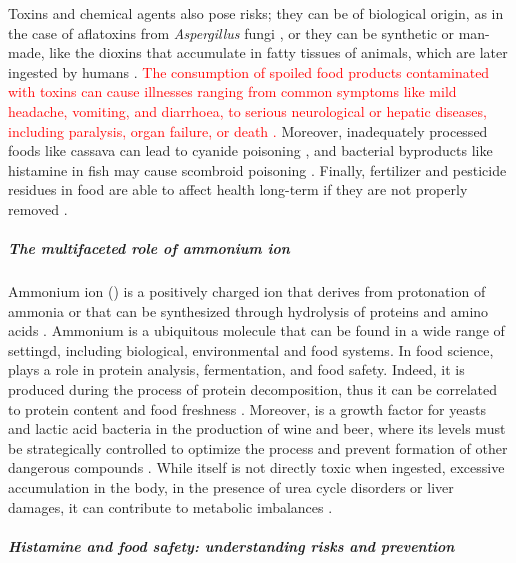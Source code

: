 Toxins and chemical agents also pose risks; they can be of biological origin, as
in the case of aflatoxins from \textit{Aspergillus} fungi
\citep{efsaContamRisk2020}, or they can be synthetic or man-made, like the
dioxins that accumulate in fatty tissues of animals, which are later ingested by
humans \citep{efsaContamRisk2018}. \textcolor{red}{The consumption of spoiled
food products contaminated with toxins can cause illnesses ranging from common
symptoms like mild headache, vomiting, and diarrhoea, to serious neurological or
hepatic diseases, including paralysis, organ failure, or death
\citep{guptaAdvances2021a}.} Moreover, inadequately processed foods like cassava
can lead to cyanide poisoning \citep{okaforOccupational2002}, and bacterial
byproducts like histamine in fish may cause scombroid poisoning
\citep{landeteUpdated2008}. Finally, fertilizer and pesticide residues in food
are able to affect health long-term if they are not properly removed
\citep{kimExposure2017}.

\subparagraph{The multifaceted role of ammonium ion}
Ammonium ion (\amm{}) is a positively charged ion that derives from protonation
of ammonia or that can be synthesized through hydrolysis of proteins and amino
acids \citep{barracloughDirect1997}. Ammonium is a ubiquitous molecule that can
be found in a wide range of settingd, including biological, environmental and
food systems. In food science, \amm{} plays a role in protein analysis,
fermentation, and food safety. Indeed, it is produced during the process of
protein decomposition, thus it can be correlated to protein content and food
freshness \citep{wuEvaluation2022}. Moreover,  is a growth factor for
yeasts and lactic acid bacteria in the production of wine and beer, where its
levels must be strategically controlled to optimize the process and prevent
formation of other dangerous compounds \citep{gomez-alonsoSimultaneous2007}.
While \amm{}  itself is not directly toxic when ingested, excessive accumulation
in the body, \eg{} in the presence of urea cycle disorders or liver damages, it
can contribute to metabolic imbalances \citep{adevaAmmonium2012}.

\subparagraph{Histamine and food safety: understanding risks and prevention}

